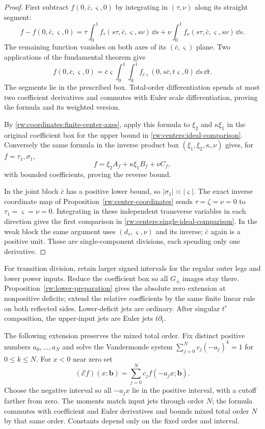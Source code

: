 \begin{proof}
First subtract $f(0,\bar c,\varsigma,0)$ by integrating in
$(\tau,\nu)$ along its straight segment:
\[
 f-f(0,\bar c,\varsigma,0)
 =\tau\int_0^1f_\tau(s\tau,\bar c,\varsigma,s\nu)\,\dd s
  +\nu\int_0^1f_\nu(s\tau,\bar c,\varsigma,s\nu)\,\dd s.
\]
The remaining function vanishes on both axes of its
$(\bar c,\varsigma)$ plane. Two applications of the fundamental
theorem give
\[
 f(0,\bar c,\varsigma,0)
 =\bar c\varsigma\int_0^1\!\int_0^1
   f_{\bar c\varsigma}(0,s\bar c,t\varsigma,0)\,\dd s\,\dd t.
\]
The segments lie in the prescribed box. Total-order differentiation
spends at most two coefficient derivatives and commutes with Euler
scale differentiation, proving the formula and its weighted version.

By \eqref{rw:coordinates:finite-center-axes}, apply this formula to
$\xi_2$ and $\kappa\xi_1$ in the original coefficient box for the
upper bound in \eqref{rw:centers:ideal-comparison}. Conversely the
same formula in the inverse product box
$(\xi_1,\xi_2,\kappa,\nu)$ gives, for $f=\tau_1,\sigma_1$,
\[
 f=\xi_2 A_f+\kappa\xi_1 B_f+\nu C_f,
\]
with bounded coefficients, proving the reverse bound.

In the joint block $\bar c$ has a positive lower bound, so
$|\sigma_1|\asymp|\varsigma|$. The exact inverse coordinate
map of Proposition~\ref{rw:center-coordinates} sends
$\tau=\zeta=\nu=0$ to
$\tau_1=\varsigma=\nu=0$. Integrating in these independent
transverse variables in each direction gives the first comparison
in \eqref{rw:centers:single-ideal-comparison}. In the weak block
the same argument uses $(d_s,\varsigma,\nu)$ and its inverse;
$\bar c$ again is a positive unit. These are single-component
divisions, each spending only one derivative.
\end{proof}

For transition division, retain larger signed intervals for the regular
outer legs and lower power inputs. Reduce the coefficient box so all
$G_\pm$ images stay there. Proposition~\ref{rw:lower-preparation}
gives the absolute zero extension at nonpositive deficits; extend the
relative coefficients by the same finite linear rule on both reflected
sides. Lower-deficit jets are ordinary. After singular $t^r$ composition,
the upper-input jets are Euler jets $t\partial_t$.

The following extension preserves the mixed total order.
Fix distinct positive numbers $a_0,\ldots,a_N$ and solve the
Vandermonde system
$\sum_{j=0}^N c_j(-a_j)^k=1$ for $0\le k\le N$.
For $x<0$ near zero set
\[
 (\mathcal Ef)(x;\mathbf b)=
       \sum_{j=0}^N c_j f(-a_jx;\mathbf b).
\]
Choose the negative interval so all $-a_jx$ lie in the positive
interval, with a cutoff farther from zero. The moments match input
jets through order $N$; the formula commutes with coefficient and
Euler derivatives and bounds mixed total order $N$ by that same
order. Constants depend only on the fixed order and interval.

